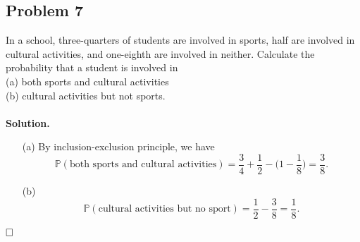 \documentclass[12pt]{article}
\begin{document}
\subsection*{Problem 7} In a school, three-quarters of students are involved in sports, half are involved in cultural activities, and one-eighth are involved in neither. Calculate the probability that a student is involved in\\
(a) both sports and cultural activities\\
(b) cultural activities but not sports.\\
\\
\textbf{Solution.} 
\begin{itemize}
   \item[(a)] By inclusion-exclusion principle, we have
\begin{equation*}
\mathbb{P}(\text{both sports and cultural activities})=\frac{3}{4}+\frac{1}{2}-\Big(1-\frac{1}{8}\Big)=\frac{3}{8}.
\end{equation*}
    \item[(b)] \begin{equation*}
\mathbb{P}(\text{cultural activities but no sport})=\frac{1}{2}-\frac{3}{8}=\frac{1}{8}.
\end{equation*}
\end{itemize}
 

$\hspace{\fill}\square$
\end{document}
